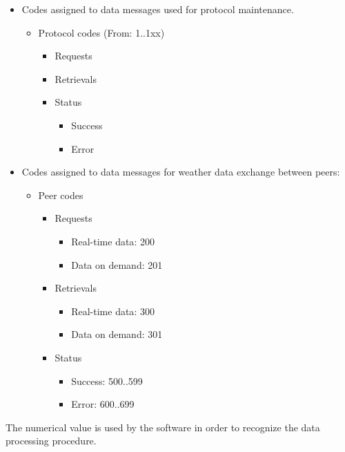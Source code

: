 \begin{itemize}
\item Codes assigned to data messages used for protocol maintenance.
	\begin{itemize}
		\item {Protocol codes (From: 1..1xx)}
		\begin{itemize}
			\item {Requests}
			\item {Retrievals}
			\item {Status}
				\begin{itemize}
					\item {Success}
					\item {Error}
				\end{itemize}
		\end{itemize}
	\end{itemize}
	\end{itemize}
\begin{itemize}
\item Codes assigned to data messages for weather data exchange between peers:
	\begin{itemize}
		\item {Peer codes}
		\begin{itemize}
			\item {Requests}
				\begin{itemize}
					\item {Real-time data}: 200
					\item {Data on demand}: 201
				\end{itemize}
			\item {Retrievals}
					\begin{itemize}
					\item {Real-time data}: 300
					\item {Data on demand}: 301
				\end{itemize}
			\item {Status}
				\begin{itemize}
					\item {Success}: 500..599
					\item {Error}: 600..699
				\end{itemize}
		\end{itemize}
\end{itemize}
\end{itemize}

The numerical value is used by the software in order to recognize the data processing procedure.


